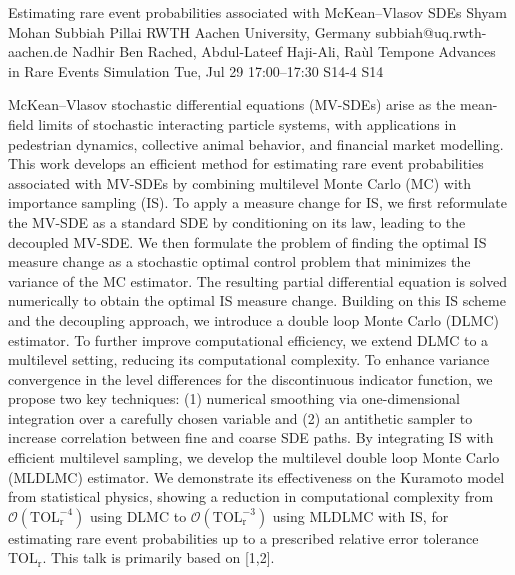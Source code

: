 \documentclass[12pt,lettersize,oneside]{book} %
\begin{document}
\begin{talk}
  {Estimating rare event probabilities associated with McKean--Vlasov SDEs}%
  {Shyam Mohan Subbiah Pillai}%
  {RWTH Aachen University, Germany}%
  {subbiah@uq.rwth-aachen.de}%
  {Nadhir Ben Rached, Abdul-Lateef Haji-Ali, Ra\`ul Tempone}%
  {Advances in Rare Events Simulation}%
  {Tue, Jul 29 17:00--17:30}%
  {S14-4}%
  {S14}%
    
   
McKean--Vlasov stochastic differential equations (MV-SDEs) arise as the mean-field limits of stochastic interacting particle systems, with applications in pedestrian dynamics, collective animal behavior, and financial market modelling. This work develops an efficient method for estimating rare event probabilities associated with MV-SDEs by combining multilevel Monte Carlo (MC) with importance sampling (IS). To apply a measure change for IS, we first reformulate the MV-SDE as a standard SDE by conditioning on its law, leading to the decoupled MV-SDE. We then formulate the problem of finding the optimal IS measure change as a stochastic optimal control problem that minimizes the variance of the MC estimator. The resulting partial differential equation is solved numerically to obtain the optimal IS measure change. Building on this IS scheme and the decoupling approach, we introduce a double loop Monte Carlo (DLMC) estimator. To further improve computational efficiency, we extend DLMC to a multilevel setting, reducing its computational complexity. To enhance variance convergence in the level differences for the discontinuous indicator function, we propose two key techniques: (1) numerical smoothing via one-dimensional integration over a carefully chosen variable and (2) an antithetic sampler to increase correlation between fine and coarse SDE paths. By integrating IS with efficient multilevel sampling, we develop the multilevel double loop Monte Carlo (MLDLMC) estimator. We demonstrate its effectiveness on the Kuramoto model from statistical physics, showing a reduction in computational complexity from $\mathcal{O}(\mathrm{TOL}_\mathrm{r}^{-4})$ using DLMC to $\mathcal{O}(\mathrm{TOL}_\mathrm{r}^{-3})$ using MLDLMC with IS, for estimating rare event probabilities up to a prescribed relative error tolerance $\mathrm{TOL}_\mathrm{r}$. This talk is primarily based on [1,2].

\medskip


\end{talk}
\end{document}

